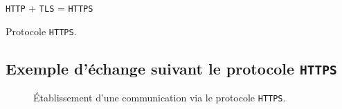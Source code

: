 \documentclass[a4paper,11pt]{article}
\begin{document}
{\tt HTTP} + {\tt TLS} = {\tt HTTPS}

\begin{center}
\begin{algorithm}
\caption{Protocole {\tt HTTPS}.}
\label{etiquette_de_l_algo_pour_y_faire_reference_plus_tard}
\end{algorithm}
\end{center}

\subsection{Exemple d'échange suivant le protocole {\tt HTTPS}}

\begin{figure}[!h]
\begin{center}
  \caption{\'Etablissement d'une communication via le protocole {\tt HTTPS}.}
  \label{etiquette_de_la_figure_pour_y_faire_reference_plus_tard}
\end{center}
\end{figure}
\end{document}
